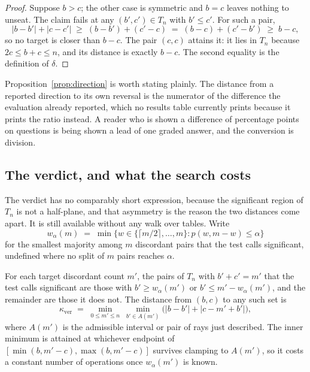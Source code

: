 \begin{proof}
Suppose $b > c$; the other case is symmetric and $b = c$ leaves nothing to
unseat. The claim fails at any $(b', c') \in T_n$ with $b' \leq c'$. For such a
pair,
\begin{equation}
  |b - b'| + |c - c'| \;\geq\; (b - b') + (c' - c) \;=\; (b - c) + (c' - b')
  \;\geq\; b - c ,
\end{equation}
so no target is closer than $b - c$. The pair $(c, c)$ attains it: it lies in
$T_n$ because $2c \leq b + c \leq n$, and its distance is exactly $b - c$. The
second equality is the definition of $\delta$.
\end{proof}

Proposition~\ref{prop:direction} is worth stating plainly. The distance from a
reported direction to its own reversal is the numerator of the difference the
evaluation already reported, which no results table currently prints because it
prints the ratio instead. A reader who is shown a difference of \HarmDiff{} percentage points on
\SubsetN{} questions is being shown a lead of one graded answer, and the
conversion is division.

\subsection{The verdict, and what the search costs}

The verdict has no comparably short expression, because the significant region
of $T_n$ is not a half-plane, and that asymmetry is the reason the two distances
come apart. It is still available without any walk over tables. Write
\begin{equation}
  w_\alpha(m) \;=\; \min\bigl\{ w \in \{\lceil m/2 \rceil, \dots, m\} :
    p(w, m - w) \leq \alpha \bigr\}
\end{equation}
for the smallest majority among $m$ discordant pairs that the test calls
significant, undefined where no split of $m$ pairs reaches $\alpha$.

\begin{proposition}\label{prop:verdict}
For each target discordant count $m'$, the pairs of $T_n$ with $b' + c' = m'$
that the test calls significant are those with $b' \geq w_\alpha(m')$ or
$b' \leq m' - w_\alpha(m')$, and the remainder are those it does not. The
distance from $(b, c)$ to any such set is
\begin{equation}\label{eq:verdict-scan}
  \kappa_{\mathrm{ver}} \;=\; \min_{0 \leq m' \leq n}\ \min_{b' \in A(m')}
    \bigl( |b - b'| + |c - m' + b'| \bigr),
\end{equation}
where $A(m')$ is the admissible interval or pair of rays just described. The
inner minimum is attained at whichever endpoint of $[\min(b, m'-c),
\max(b, m'-c)]$ survives clamping to $A(m')$, so it costs a constant number of
operations once $w_\alpha(m')$ is known.
\end{proposition}

